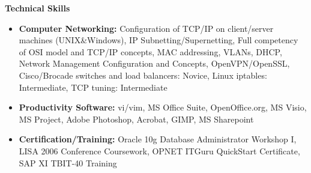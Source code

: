\documentclass[10pt,oneside]{article}
\newenvironment{ressection}[1]{
	\vspace{4pt}
	\textbf{\selectfont\normalsize#1}
	\begin{itemize}
	\vspace{3pt}
}{
	\end{itemize}
}
\newcommand{\resitem}[1]{
	\vspace{-4pt}
	\item \begin{flushleft} #1 \end{flushleft}
}
\begin{document}
\begin{ressection}{Technical Skills}
	\resitem{\textbf{Computer Networking:} Configuration of TCP/IP on client/server machines (UNIX\&Windows), IP Subnetting/Supernetting, Full competency of OSI model and TCP/IP concepts, MAC addressing, VLANs, DHCP, Network Management Configuration and Concepts, OpenVPN/OpenSSL, Cisco/Brocade switches and load balancers: Novice, Linux iptables: Intermediate, TCP tuning: Intermediate}

	\resitem{\textbf{Productivity Software:} vi/vim, MS Office Suite, OpenOffice.org, MS Visio, MS Project, Adobe Photoshop, Acrobat, GIMP, MS Sharepoint}

	\resitem{\textbf{Certification/Training:} Oracle 10g Database Administrator Workshop I, LISA 2006 Conference Coursework, OPNET ITGuru QuickStart Certificate, SAP XI TBIT-40 Training}
	
\end{ressection}

\end{document}
